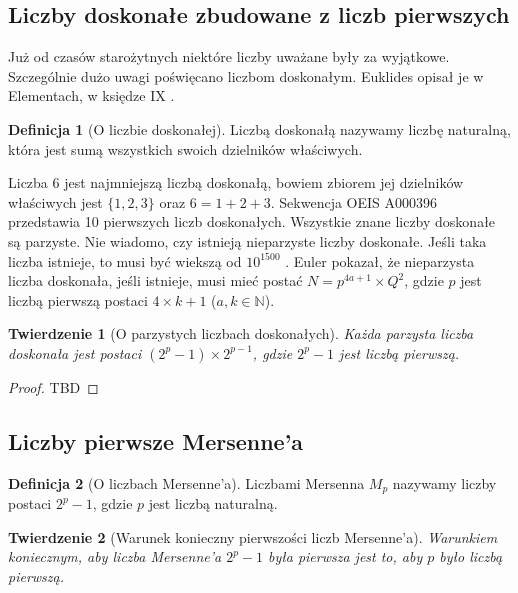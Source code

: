 \documentclass[10pt,onecolumn]{article}
\newtheorem{theorem}{Twierdzenie}
\theoremstyle{definition}
\newtheorem{definition}{Definicja}
\theoremstyle{hypothesis}
\theoremstyle{capability}
\begin{document}
\subsection{Liczby doskonałe zbudowane z liczb pierwszych}

Już od czasów starożytnych niektóre liczby uważane były za wyjątkowe. Szczególnie dużo uwagi poświęcano liczbom doskonałym. Euklides opisał je w Elementach, w księdze IX \cite{euklides}.

\begin{definition} [O liczbie doskonałej]
Liczbą doskonałą nazywamy liczbę naturalną, która jest sumą wszystkich swoich dzielników właściwych.
\end{definition}

Liczba $6$ jest najmniejszą liczbą doskonałą, bowiem zbiorem jej dzielników właściwych jest $\lbrace 1, 2, 3 \rbrace$ oraz $6 = 1 + 2 +3$. Sekwencja OEIS A000396 przedstawia 10 pierwszych liczb doskonałych.
Wszystkie znane liczby doskonałe są parzyste. Nie wiadomo, czy istnieją nieparzyste liczby doskonałe. Jeśli taka liczba istnieje, to musi być wiekszą od $10^{1500}$ \cite{ochemrao2012}. Euler pokazał, że nieparzysta liczba doskonała, jeśli istnieje, musi mieć postać $N = p^{4a+1} \times Q^2$, gdzie $p$ jest liczbą pierwszą postaci $4 \times k+1$ ($a, k \in \mathbb{N}$).

\begin{theorem}[O parzystych liczbach doskonałych]
Każda parzysta liczba doskonała jest postaci $(2^p - 1) \times 2^{p - 1}$, gdzie $2^p - 1$ jest liczbą pierwszą.
\end{theorem}

\begin{proof}
TBD
\end{proof}

\subsection{Liczby pierwsze Mersenne'a}

\begin{definition} [O liczbach Mersenne'a]
Liczbami Mersenna $M_p$ nazywamy liczby postaci $2^p - 1$, gdzie $p$ jest liczbą naturalną.
\end{definition}

\begin{theorem}[Warunek konieczny pierwszości liczb Mersenne'a]
Warunkiem koniecznym, aby liczba Mersenne'a $2^p - 1$ była pierwsza jest to, aby $p$ było liczbą pierwszą.
\end{theorem}
\end{document}
